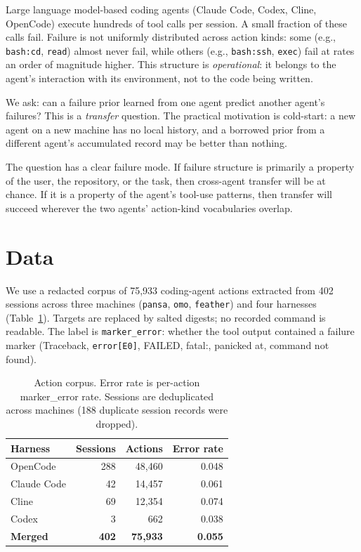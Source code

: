 \documentclass[11pt]{article}
\begin{document}
Large language model-based coding agents (Claude Code, Codex, Cline,
OpenCode) execute hundreds of tool calls per session. A small fraction of
these calls fail. Failure is not uniformly distributed across action kinds:
some (e.g., \texttt{bash:cd}, \texttt{read}) almost never fail, while
others (e.g., \texttt{bash:ssh}, \texttt{exec}) fail at rates an order of
magnitude higher. This structure is \emph{operational}: it belongs to the
agent's interaction with its environment, not to the code being written.

We ask: can a failure prior learned from one agent predict another agent's
failures? This is a \emph{transfer} question. The practical motivation is
cold-start: a new agent on a new machine has no local history, and a
borrowed prior from a different agent's accumulated record may be better
than nothing.

The question has a clear failure mode. If failure structure is primarily a
property of the user, the repository, or the task, then cross-agent transfer
will be at chance. If it is a property of the agent's tool-use patterns,
then transfer will succeed wherever the two agents' action-kind vocabularies
overlap.

\section{Data}

We use a redacted corpus of 75,933 coding-agent actions extracted from
402 sessions across three machines (\texttt{pansa}, \texttt{omo},
\texttt{feather}) and four harnesses (Table~\ref{tab:corpus}). Targets
are replaced by salted digests; no recorded command is readable. The
label is \texttt{marker\_error}: whether the tool output contained a
failure marker (Traceback, \texttt{error[E0]}, FAILED, fatal:, panicked at,
command not found).

\begin{table}[h]
\centering
\begin{tabular}{lrrr}
\toprule
\textbf{Harness} & \textbf{Sessions} & \textbf{Actions} & \textbf{Error rate} \\
\midrule
OpenCode & 288 & 48,460 & 0.048 \\
Claude Code & 42 & 14,457 & 0.061 \\
Cline & 69 & 12,354 & 0.074 \\
Codex & 3 & 662 & 0.038 \\
\midrule
\textbf{Merged} & \textbf{402} & \textbf{75,933} & \textbf{0.055} \\
\bottomrule
\end{tabular}
\caption{Action corpus. Error rate is per-action marker\_error rate.
Sessions are deduplicated across machines (188 duplicate session records
were dropped).}
\label{tab:corpus}
\end{table}
\end{document}
